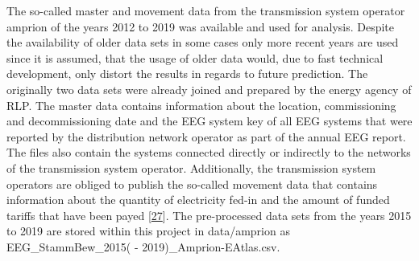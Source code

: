 \documentclass[a4paper,11pt]{article}
\begin{document}
The so-called master and movement data from the transmission system operator amprion of the years 2012 to 2019 was available and used for analysis. Despite the availability of older data sets in some cases only more recent years are used since it is assumed, that the usage of older data would, due to fast technical development, only distort the results in regards to future prediction. The originally two data sets were already joined and prepared by the energy agency of RLP. The master data contains information about the location, commissioning and decommissioning date and the EEG system key of all EEG systems that were reported by the distribution network operator as part of the annual EEG report. The files also contain the systems connected directly or indirectly to the networks of the transmission system operator. Additionally, the transmission system operators are obliged to publish the so-called movement data that contains information about the quantity of electricity fed-in and the amount of funded tariffs that have been payed {[}\protect\hyperlink{ref-AmprionGmbH.2019}{27}{]}. The pre-processed data sets from the years 2015 to 2019 are stored within this project in data/amprion as EEG\_StammBew\_2015( - 2019)\_Amprion-EAtlas.csv.
\end{document}
